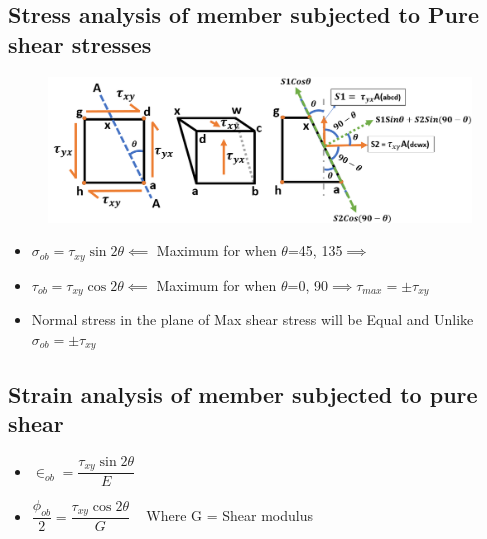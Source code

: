 \documentclass[8pt]{report}
\begin{document}
	\subsection{Stress analysis of member subjected to Pure shear stresses}
		\begin{figure}[H]
			\centering
			\includegraphics[scale=0.55]{case_pureshear.png}
		\end{figure}
		\begin{itemize}
			\item $\boxed{\sigma_{ob} = \tau_{xy}\sin 2\theta} \impliedby$ Maximum for when $\theta$=45\textdegree , 135\textdegree $\implies$ 
			\item $\boxed{\tau_{ob} = \tau_{xy}\cos 2\theta}\impliedby$ Maximum for when $\theta$=0\textdegree , 90\textdegree $\implies \boxed{\tau_{max} = \pm\tau_{xy}}$ 
			\item Normal stress in the plane of Max shear stress will be Equal and Unlike ${\sigma_{ob} = \pm\tau_{xy}}$ 
		\end{itemize}\hrulefill
	\subsection{Strain analysis of member subjected to pure shear}
		\begin{itemize}
			\item $\boxed{\in_{ob} = \dfrac{\tau_{xy}\sin 2\theta}{E}}\;\;\;$
			\item $\boxed{\dfrac{\phi_{ob}}{2} = \dfrac{\tau_{xy}\cos 2\theta}{G}}\;\;\;$ Where G = Shear modulus
		\end{itemize}\hrulefill
\end{document}
